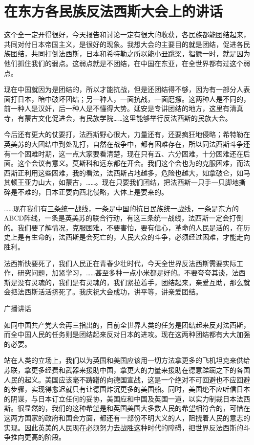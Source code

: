 \section[在东方各民族反法西斯大会上的讲话（一九四一年十月三十日）]{在东方各民族反法西斯大会上的讲话}


这个全一定开得很好，今天报告和讨论一定有很大的收获，各民族都能团结起来，共同对付日本帝国主义，是很好的现象。我想大会的主要目的就是团结，促进各民族团结，共同打倒法西斯，日本和希特勒之所以能小丑跳梁，猖獗一时，就是因为他们抓住我们的弱点。这弱点就是不团结，在中国在东亚，在全世界都有过这个弱点。

现在中国就因为是团结的，所以才能抗战，但是还团结得不够，因为有一部分人表面打日本，暗中破坏团结；另一种人，一面抗战，一面磨擦。这两种人是不同的，前一种人是汉奸，后一种人是不懂得大势。延安是专讲团结的地方，这里有清真寺，有蒙古文化促进会，有民族学院……这里能够举行反法西斯的民族大会。

今后还有更大的仗要打，法西斯野心很大，力量还有，还要疯狂地侵略；希特勒在英美苏的大团结中到处乱打，自然在战争中，都有困难存在，所以同法西斯斗争还有一个困难时期，这一点大家要看清楚，现在只有五、六分困难，十分困难还在后面。这个会议有意义。莫斯科和远东都在开会。我们这个会也为的克服困难，而法西斯正利用这些困难，我的看法，法西斯占地越多，危险也越大，如拿破仑，如马其顿王亚力山大，如蒙古，……。现在只要我们团结，把法西斯一只手一只脚地撕碎是不难的，日本正要向西北侵略，大体上是要来的。

……现在我们有三条统一战线，一条是中国的抗日民族统一战线，一条是东方的ABCD阵线，一条是英美苏的联合行动，有这三条统一战线，法西斯一定会打倒的。我们要了解情况，克服困难，不要害怕，要有信心，革命的人民是活的，在历史上是有生命的，法西斯是会死亡的，人民大众的斗争，必须经过困难，才能走向胜利。

法西斯快要死了，我们人民正在青春少壮时代，今天全世界反法西斯需要实际工作，研究问题，加紧学习，……甚至多种一点小米都是好的。不要夸夸其谈，法西斯是没有灵魂的，我们是有灵魂的，我们紧拉着手，团结起来，亲爱互助，那么就会把法西斯活活挤死了。我庆祝大会成功，讲平等，讲亲爱团结。

广播讲话

如同中国共产党大会再三指出的，目前全世界人类的任务是团结起来反对法西斯，而全中国人民的任务则是团结起来反对日本的进攻。现在这两种团结都有大大加强的必要。

站在人类的立场上，我们以为英国和美国应该用一切方法拿更多的飞机坦克来供给苏联，拿更多经费和武器来援助中国，拿更大的力量来援助在德意蹂躏之下的各国人民的起义。美国应该毫不踌躇的向德国宣战，这是一个绝对不可回避也不应回避的步骤，实现得愈迟就只有让德国炸沉更多的美国船。同时，美国绝不应听信日本的阴谋，与日本订立任何的妥协，美国应和中国及英国一道，以实力制裁日本法西斯。很显然的，我们的这种希望是和英国美国大多数人民的希望相符合的，可惜在这两方国家的政府和国会方面，都还有一部份不明大义的人，阻挠着人民的意志的实现。因此英美的人民现在必须努力去战胜这种时代的障碍，把世界反法西斯的斗争推向更高的阶段。

